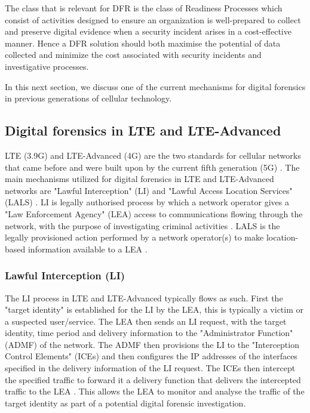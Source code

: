 \documentclass[final,1p,times,authoryear]{elsarticle}
\begin{document}
The class that is relevant for DFR is the class of Readiness Processes which consist of activities designed to ensure an organization is well-prepared to collect and preserve digital evidence when a security incident arises in a cost-effective manner. Hence a DFR solution should both maximise the potential of data collected and minimize the cost associated with security incidents and investigative processes.

\vspace{1em}

In this next section, we discuss one of the current mechanisms for digital forensics in previous generations of cellular technology.

\subsection{Digital forensics in LTE and LTE-Advanced}
\label{sub2sec3}
LTE (3.9G) and LTE-Advanced (4G) are the two standards for cellular networks that came before and were built upon by the current fifth generation (5G) \citep{hajlaoui20204g}. The main mechanisms utilized for digital forensics in LTE and LTE-Advanced networks are "Lawful Interception" (LI) and "Lawful Access Location Services" (LALS) \citep{sharevski2018towards}. LI is legally authorised process by which a network operator gives a "Law Enforcement Agency" (LEA) access to communications flowing through the network, with the purpose of investigating criminal activities \citep{thorogood2007lawful,sharevski2018towards}. LALS is the legally provisioned action performed by a network operator(s) to make location-based information available to a LEA \citep{sharevski2018towards}.

\subsubsection{Lawful Interception (LI)}
\label{sub2sub3sec1}
The LI process in LTE and LTE-Advanced typically flows as such. First the "target identity" is established for the LI by the LEA, this is typically a victim or a suspected user/service. The LEA then sends an LI request, with the target identity, time period and delivery information to the "Administrator Function" (ADMF) of the network. The ADMF then provisions the LI to the "Interception Control Elements" (ICEs) and then configures the IP addresses of the interfaces specified in the delivery information of the LI request. The ICEs then intercept the specified traffic to forward it a delivery function that delivers the intercepted traffic to the LEA \citep{sharevski2018towards}. This allows the LEA to monitor and analyse the traffic of the target identity as part of a potential digital forensic investigation.
\end{document}
